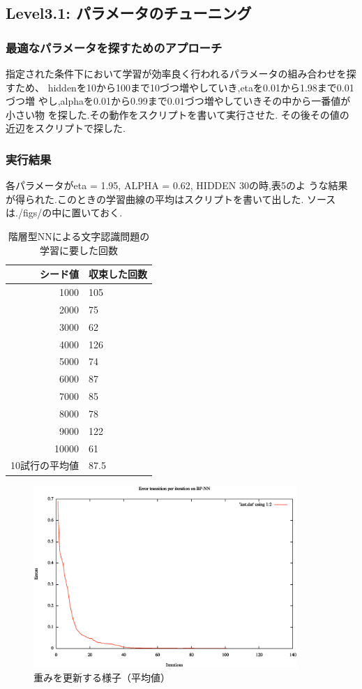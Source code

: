 \subsection{Level3.1: パラメータのチューニング}%
\subsubsection{最適なパラメータを探すためのアプローチ}
指定された条件下において学習が効率良く行われるパラメータの組み合わせを探
すため、
hiddenを10から100まで10づつ増やしていき,etaを0.01から1.98まで0.01づつ増
やし,alphaを0.01から0.99まで0.01づつ増やしていきその中から一番値が小さい物
を探した.その動作をスクリプトを書いて実行させた.
その後その値の近辺をスクリプトで探した.
\subsubsection{実行結果}
各パラメータがeta = 1.95, ALPHA = 0.62, HIDDEN 30の時,表5のよ
うな結果が得られた.このときの学習曲線の平均はスクリプトを書いて出した.
ソースは./figs/の中に置いておく.
\begin{table}[htb]
 \begin{center}
  \caption{階層型NNによる文字認識問題の学習に要した回数}
  \label{table:level3}
  \begin{tabular}[htb]{r|l} \hline
   シード値 & 収束した回数 \\ \hline \hline
   1000 & 105 \\ \hline
   2000 & 75 \\ \hline
   3000 & 62 \\ \hline
   4000 & 126 \\ \hline
   5000 & 74 \\ \hline
   6000 & 87 \\ \hline
   7000 & 85 \\ \hline
   8000 & 78 \\ \hline
   9000 & 122 \\ \hline
   10000 & 61 \\ \hline \hline
   10試行の平均値 & 87.5 \\ \hline
  \end{tabular}
 \end{center}
\end{table}

\begin{figure}[h]
 \begin{center}
  \includegraphics[width=10.0cm]{./figs/average.eps}
  \caption{重みを更新する様子（平均値）}
  \label{fig:level2}
 \end{center}
\end{figure}
\newpage



